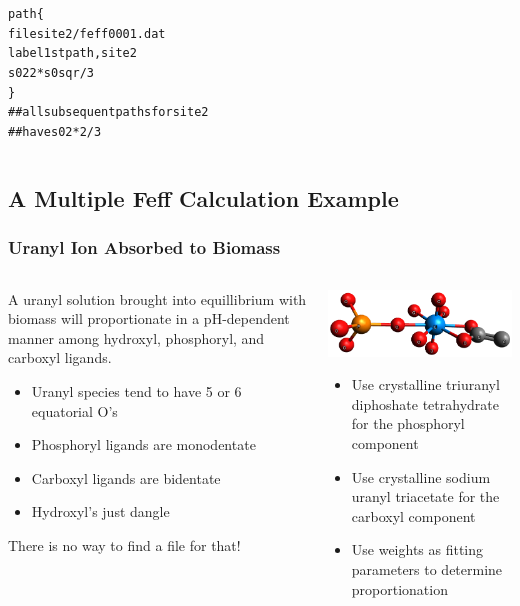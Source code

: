\documentclass[10pt, xcolor=x11names, compress]{beamer}
\begin{document}
\begin{frame}[fragile]
\begin{columns}[B]
\begin{column}{0.5\linewidth}
\begin{alltt}
  {\color{Purple4}path} \{
     {\color{Gold4}file}    site2/feff0001.dat
     {\color{Gold4}label}   1st path, site 2
     {\color{Gold4}s02}     2 * s0sqr / 3
   \}
  {\color{Blue4}## all subsequent paths for site 2
  ## have} {\color{Gold4}s02}{\color{Blue4} * 2/3}
      \end{alltt}      
    \end{column}
  \end{columns}
\end{frame}

\subsection[Example]{A Multiple Feff Calculation Example}
\begin{frame}
  \frametitle{Uranyl Ion Absorbed to Biomass}

  \begin{columns}[T]
    \begin{column}{0.5\linewidth}
      A uranyl solution brought into equillibrium with biomass will
      proportionate in a pH-dependent manner among hydroxyl,
      phosphoryl, and carboxyl ligands.
      \begin{itemize}
      \item Uranyl species tend to have 5 or 6 equatorial O's
      \item Phosphoryl ligands are monodentate
      \item Carboxyl ligands are bidentate
      \item Hydroxyl's just dangle
      \end{itemize}
      \begin{alertblock}{}
        There is no way to find a  file for that!
      \end{alertblock}
    \end{column}
    \begin{column}{0.5\linewidth}
      \quad\includegraphics[width=0.8\linewidth]{mfc/uranyl.png}
      \begin{itemize}
      \item Use crystalline triuranyl diphoshate tetrahydrate for the
        phosphoryl component
      \item Use crystalline sodium uranyl triacetate for the carboxyl
        component 
      \item Use weights as fitting parameters to determine proportionation
      \end{itemize}
    \end{column}
  \end{columns}



\end{frame}
\end{document}
